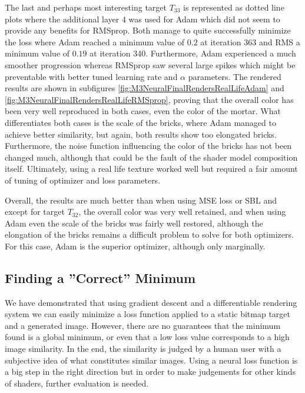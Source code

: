 The last and perhaps most interesting target $T_{33}$ is represented as dotted line plots where the additional layer $4$ was used for Adam which did not seem to provide any benefits for RMSprop. Both manage to quite successfully minimize the loss where Adam reached a minimum value of $0.2$ at iteration 363 and RMS a minimum value of $0.19$ at iteration 340. Furthermore, Adam experienced a much smoother progression whereas RMSprop saw several large spikes which might be preventable with better tuned learning rate and $\alpha$ parameters. The rendered results are shown in subfigures \ref{fig:M3NeuralFinalRendersRealLifeAdam} and \ref{fig:M3NeuralFinalRendersRealLifeRMSprop}, proving that the overall color has been very well reproduced in both cases, even the color of the mortar. What differentiates both cases is the scale of the bricks, where Adam managed to achieve better similarity, but again, both results show too elongated bricks. Furthermore, the noise function influencing the color of the bricks has not been changed much, although that could be the fault of the shader model composition itself. Ultimately, using a real life texture worked well but required a fair amount of tuning of optimizer and loss parameters.

Overall, the results are much better than when using MSE loss or SBL and except for target $T_{32}$, the overall color was very well retained, and when using Adam even the scale of the bricks was fairly well restored, although the elongation of the bricks remains a difficult problem to solve for both optimizers. For this case, Adam is the superior optimizer, although only marginally.


\subsection{Finding a ''Correct'' Minimum}

We have demonstrated that using gradient descent and a differentiable rendering system we can easily minimize a loss function applied to a static bitmap target and a generated image. However, there are no guarantees that the minimum found is a global minimum, or even that a low loss value corresponds to a high image similarity. In the end, the similarity is judged by a human user with a subjective idea of what constitutes similar images. Using a neural loss function is a big step in the right direction but in order to make judgements for other kinds of shaders, further evaluation is needed.

